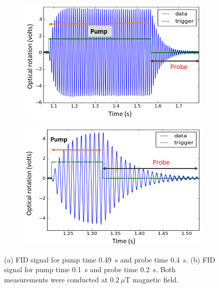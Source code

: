 \begin{figure}
\centering
\begin{subfigure}[b]{0.46\textwidth}
  \centering
  \includegraphics[width=\textwidth]{figures/Capture}
  \caption{}
  \label{fig:pump-long}
\end{subfigure}
\hfill
\begin{subfigure}[b]{0.45\textwidth}
  \centering
  \includegraphics[width=\textwidth]{figures/FID_optimized.png}
  \caption{}
  \label{fig:pump-short}
\end{subfigure}
\caption{(a) FID signal for pump time 0.49~s and probe time 0.4~s. (b)
  FID signal for pump time 0.1~s and probe time 0.2~s.  Both
  measurements were conducted at $0.2~\mu$T magnetic field.}
    \label{fig:pump-time}
\end{figure} 


